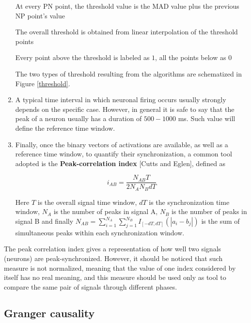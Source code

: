 \documentclass[12pt, a4paper]{article}
\begin{document}
\begin{enumerate}
\begin{algorithm}
\begin{algorithmic}[1]
			
			\State At every PN point, the threshold value is the MAD value plus the previous NP point's value
			
			\State The overall threshold is obtained from linear interpolation of the threshold points
			
			\State Every point above the threshold is labeled as $1$, all the points below as $0$
		\end{algorithmic}
	\end{algorithm}
	
		The two types of threshold resulting from the algorithms are schematized in Figure \ref{threshold}.
	
	
	\item A typical time interval in which neuronal firing occurs usually strongly depends on the specific case. However, in general it is safe to say that the peak of a neuron usually has a duration of $500-1000$ ms. Such value will define the reference time window. 
	
	\item Finally, once the binary vectors of activations are available, as well as a reference time window, to quantify their synchronization, a common tool adopted is the \textbf{Peak-correlation index} [Cutts and Eglen], defined as 
	
	\begin{equation}
		i_{AB} = \frac{N_{AB} T}{2 N_A N_B dT} \label{peak index}
	\end{equation}
	 
	Here $T $ is the overall signal time window, $dT$ is the synchronization time window, $N_A$ is the number of peaks in signal A, $N_B $ is the number of peaks in signal B and finally $N_{AB} = \sum_{i=1}^{N_A} \sum_{j=1}^{N_B} I_{[-dT,dT]}(|a_i - b_j|) $ is the sum of simultaneous peaks within each synchronization window.
	
\end{enumerate}

The peak correlation index gives a representation of how well two signals (neurons) are peak-synchronized. However, it should be noticed that such measure is not normalized, meaning that the value of one index considered by itself has no real meaning, and this measure should be used only as tool to compare the same pair of signals through different phases.





\subsection{Granger causality}
\end{document}
